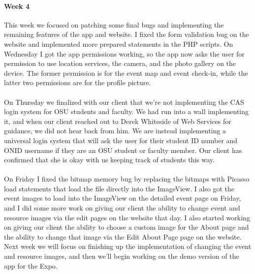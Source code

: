 \documentclass[onecolumn, draftclsnofoot,10pt, compsoc]{IEEEtran}
\begin{document}
      \paragraph{Week 4}
      This week we focused on patching some final bugs and implementing the remaining features of the app and website. I fixed the form validation bug on the website and implemented more prepared statements in the PHP scripts. On Wednesday I got the app permissions working, so the app now asks the user for permission to use location services, the camera, and the photo gallery on the device. The former permission is for the event map and event check-in, while the latter two permissions are for the profile picture. \\ \\
      On Thursday we finalized with our client that we're not implementing the CAS login system for OSU students and faculty. We had run into a wall implementing it, and when our client reached out to Derek Whiteside of Web Services for guidance, we did not hear back from him. We are instead implementing a universal login system that will ask the user for their student ID number and ONID username if they are an OSU student or faculty member. Our client has confirmed that she is okay with us keeping track of students this way. \\ \\
      On Friday I fixed the bitmap memory bug by replacing the bitmaps with Picasso load statements that load the file directly into the ImageView. I also got the event images to load into the ImageView on the detailed event page on Friday, and I did some more work on giving our client the ability to change event and resource images via the edit pages on the website that day. I also started working on giving our client the ability to choose a custom image for the About page and the ability to change that image via the Edit About Page page on the website. Next week we will focus on finishing up the implementation of changing the event and resource images, and then we'll begin working on the demo version of the app for the Expo. \\ \\
\end{document}
